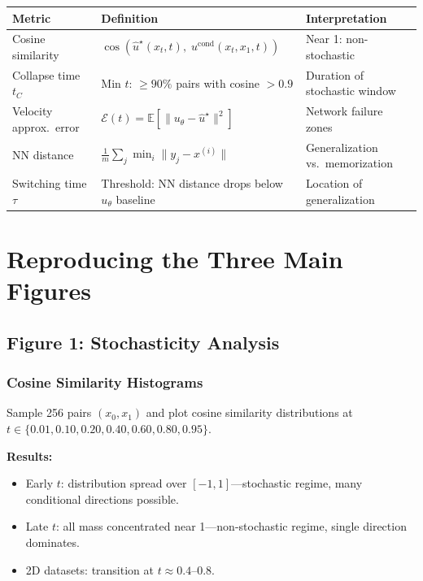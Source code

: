 \documentclass[11pt, a4paper]{article}
\newcommand{\E}{\mathbb{E}}
\theoremstyle{plain}
\theoremstyle{definition}
\theoremstyle{remark}
\begin{document}
\begin{center}
\renewcommand{\arraystretch}{1.3}
\begin{tabularx}{\textwidth}{lXl}
\toprule
\textbf{Metric} & \textbf{Definition} & \textbf{Interpretation} \\
\midrule
Cosine similarity & $\cos(\hat{u}^\star(x_t,t),\; u^{\mathrm{cond}}(x_t,x_1,t))$ & Near 1: non-stochastic \\
Collapse time $t_C$ & Min $t$: $\geq 90\%$ pairs with cosine $> 0.9$ & Duration of stochastic window \\
Velocity approx.\ error & $\mathcal{E}(t) = \E[\|u_\theta - \hat{u}^\star\|^2]$ & Network failure zones \\
NN distance & $\frac{1}{m}\sum_j \min_i \|y_j - x^{(i)}\|$ & Generalization vs.\ memorization \\
Switching time $\tau$ & Threshold: NN distance drops below $u_\theta$ baseline & Location of generalization \\
\bottomrule
\end{tabularx}
\end{center}

\section{Reproducing the Three Main Figures}
\label{sec:replication}

\subsection{Figure 1: Stochasticity Analysis}

\subsubsection{Cosine Similarity Histograms}

Sample 256 pairs $(x_0, x_1)$ and plot cosine similarity distributions at $t \in \{0.01, 0.10, 0.20, 0.40, 0.60, 0.80, 0.95\}$.

\textbf{Results:}
\begin{itemize}
  \item Early $t$: distribution spread over $[-1,1]$---stochastic regime, many conditional directions possible.
  \item Late $t$: all mass concentrated near 1---non-stochastic regime, single direction dominates.
  \item 2D datasets: transition at $t \approx 0.4$--$0.8$.
\end{itemize}
\end{document}
